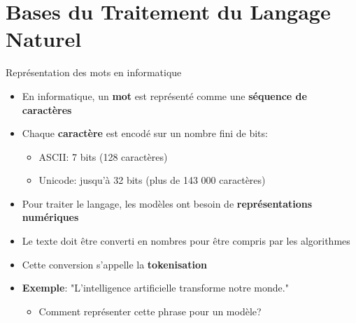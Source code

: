 \documentclass[aspectratio=169,11pt]{beamer}
\begin{document}
\section{Bases du Traitement du Langage Naturel}

\begin{frame}{Représentation des mots en informatique}
    \begin{itemize}
        \item En informatique, un \textbf{mot} est représenté comme une \textbf{séquence de caractères}
        \item Chaque \textbf{caractère} est encodé sur un nombre fini de bits:
        \begin{itemize}
            \item ASCII: 7 bits (128 caractères)
            \item Unicode: jusqu'à 32 bits (plus de 143 000 caractères)
        \end{itemize}
        \vspace{0.3cm}
        \item Pour traiter le langage, les modèles ont besoin de \textbf{représentations numériques}
        \item Le texte doit être converti en nombres pour être compris par les algorithmes
        \item Cette conversion s'appelle la \textbf{tokenisation}
        \vspace{0.3cm}
        \item \textbf{Exemple}: "L'intelligence artificielle transforme notre monde."
        \begin{itemize}
            \item Comment représenter cette phrase pour un modèle?
        \end{itemize}
    \end{itemize}
\end{frame}
\end{document}
